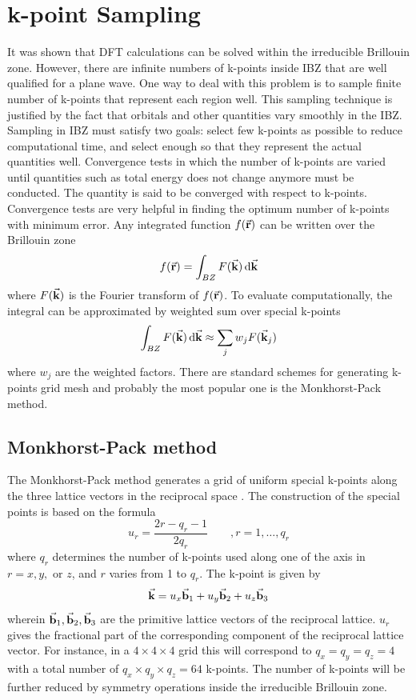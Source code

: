 \section{k-point Sampling}
It was shown that DFT calculations can be solved within the irreducible Brillouin zone. However, there are infinite numbers of k-points inside IBZ that are well qualified for a plane wave. One way to deal with this problem is to sample finite number of k-points that represent each region well. This sampling technique is justified by the fact that orbitals and other quantities vary smoothly in the IBZ. Sampling in IBZ must satisfy two goals: select few k-points as possible to reduce computational time, and select enough so that they represent the actual quantities well. Convergence tests  in which the  number of k-points are varied until quantities such as total energy does not change anymore must be conducted. The quantity is said to be converged with respect to k-points.  Convergence tests are very helpful in finding the optimum number of k-points with minimum error. Any integrated function $f(\va{r})$ can be written over the Brillouin zone
\begin{equation}
    f(\va{r}) = \int_{BZ} F(\va{k}) \dd{\va{k}}
\end{equation}
where $F(\va{k})$ is the Fourier transform of $f(\va{r})$. To evaluate computationally, the integral can be approximated by weighted sum over special k-points
\begin{equation}
    \int_{BZ} F(\va{k}) \dd{\va{k}} \approx \sum_{j} w_{j}  F(\va{k}_j)
\end{equation}
where $w_{j}$ are the weighted factors. 
There are standard schemes for generating k-points grid mesh and probably the most popular one is the Monkhorst-Pack method.  

\subsection{Monkhorst-Pack method}
The Monkhorst-Pack method generates a grid of uniform special k-points along the three lattice vectors in the reciprocal space \citep{Monkhorst1976}. The construction of the special points is based on the formula
\begin{equation}
    u_{r} = \frac{2r - q_r -1}{2 q_r} \qquad , r = 1, \dots, q_r
\end{equation}
where $q_r$ determines the number of k-points  used along one of the axis in $r = x, y, {\text{ or }} z$, and  $r$ varies from 1 to $q_r$. The k-point is given by
\begin{equation}
    \va{k} = u_x \va{b}_1 + u_y \va{b}_2 + u_z \va{b}_3
\end{equation}
wherein $\va{b}_1, \va{b}_2, \va{b}_3$ are the primitive lattice vectors of the reciprocal lattice. $u_r$ gives the fractional part of the corresponding component of the reciprocal lattice vector. For instance, in a $4 \times 4 \times 4$ grid this will correspond to $q_x = q_y = q_z = 4$ with a total number of $q_x \times q_y \times q_z = 64$ k-points. The number of k-points will be further reduced by symmetry operations inside the irreducible Brillouin zone. 

